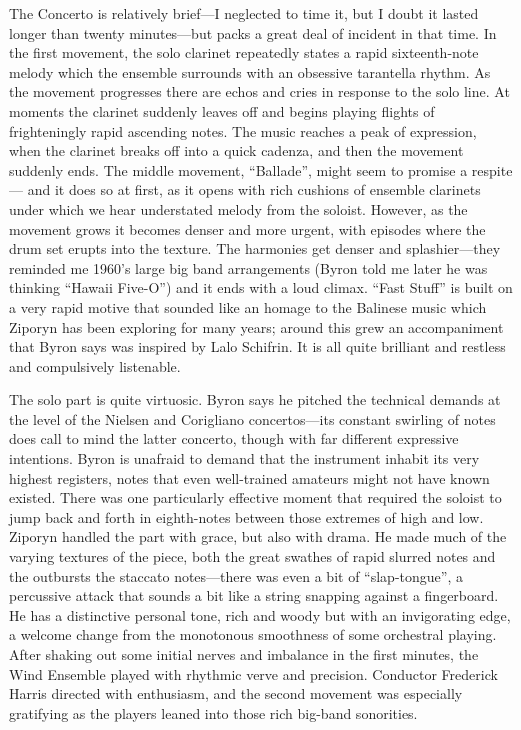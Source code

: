 The Concerto is relatively brief—I neglected to time it, but I doubt it lasted longer than twenty minutes—but packs a great deal of incident in that time. In the first movement, the solo clarinet repeatedly states a rapid sixteenth-note melody which the ensemble surrounds with an obsessive tarantella rhythm. As the movement progresses there are echos and cries in response to the solo line. At moments the clarinet suddenly leaves off and begins playing flights of frighteningly rapid ascending notes. The music reaches a peak of expression, when the clarinet breaks off into a quick cadenza, and then the movement suddenly ends. The middle movement, “Ballade”, might seem to promise a respite— and it does so at first, as it opens with rich cushions of ensemble clarinets under which we hear understated melody from the soloist. However, as the movement grows it becomes denser and more urgent, with episodes where the drum set erupts into the texture. The harmonies get denser and splashier—they reminded me 1960’s large big band arrangements (Byron told me later he was thinking “Hawaii Five-O”) and it ends with a loud climax. “Fast Stuff” is built on a very rapid motive that sounded like an homage to the Balinese music which Ziporyn has been exploring for many years; around this grew an accompaniment that Byron says was inspired by Lalo Schifrin. It is all quite brilliant and restless and compulsively listenable.

The solo part is quite virtuosic. Byron says he pitched the technical demands at the level of the Nielsen and Corigliano concertos—its constant swirling of notes does call to mind the latter concerto, though with far different expressive intentions. Byron is unafraid to demand that the instrument inhabit its very highest registers, notes that even well-trained amateurs might not have known existed. There was one particularly effective moment that required the soloist to jump back and forth in eighth-notes between those extremes of high and low. Ziporyn handled the part with grace, but also with drama. He made much of the varying textures of the piece, both the great swathes of rapid slurred notes and the outbursts the staccato notes—there was even a bit of “slap-tongue”, a percussive attack that sounds a bit like a string snapping against a fingerboard. He has a distinctive personal tone, rich and woody but with an invigorating edge, a welcome change from the monotonous smoothness of some orchestral playing. After shaking out some initial nerves and imbalance in the first minutes, the Wind Ensemble played with rhythmic verve and precision. Conductor Frederick Harris directed with enthusiasm, and the second movement was especially gratifying as the players leaned into those rich big-band sonorities.

